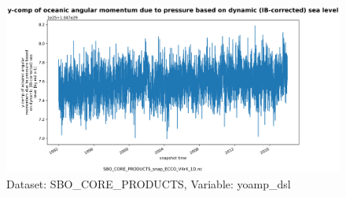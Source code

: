 \begin{figure}[H]
\centering
\includegraphics[scale=0.55]{../images/plots/oneD_plots/SBO_Core_Products/yoamp_dsl.png}
\caption{Dataset: SBO\_CORE\_PRODUCTS, Variable: yoamp\_dsl}
\label{tab:table-SBO_CORE_PRODUCTS_yoamp_dsl-Plot}
\end{figure}
\pagebreak
